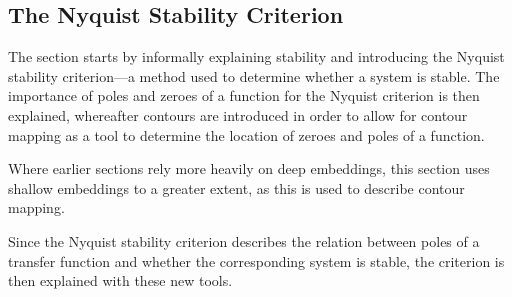 \subsection{The Nyquist Stability Criterion}
The section starts by informally explaining stability and introducing the Nyquist stability criterion---a method used to determine whether a system is stable. The importance of poles and zeroes of a function for the Nyquist criterion is then explained, whereafter contours are introduced in order to allow for contour mapping as a tool to determine the location of zeroes and poles of a function. 
\begin{newtext}
Where earlier sections rely more heavily on deep embeddings, this section uses shallow embeddings to a greater extent, as this is used to describe contour mapping. 
\end{newtext}
\begin{modtext}
Since the Nyquist stability criterion describes the relation between poles of a transfer function and whether the corresponding system is stable, the criterion is then %
explained with these new tools.
\end{modtext}

%
%

%
